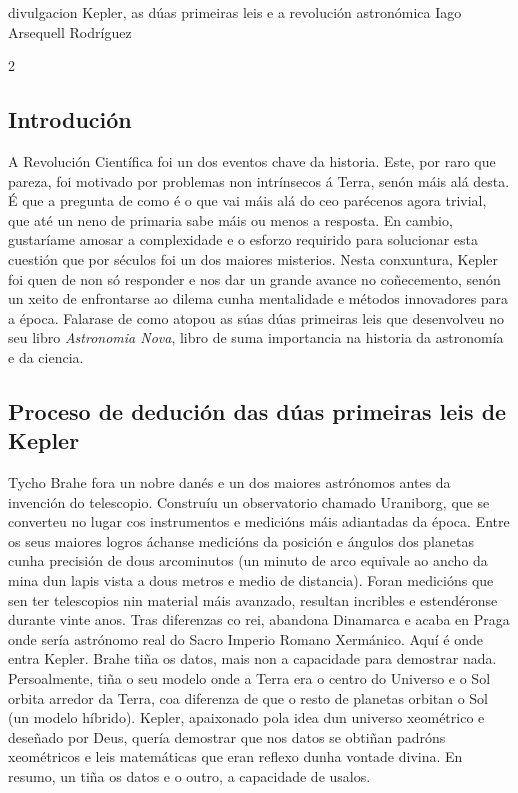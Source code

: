 \Artigo%
{divulgacion}%
{Kepler, as dúas primeiras leis e a revolución astronómica}%
{Iago Arsequell Rodríguez}%
{}%

\begin{multicols}{2}

\subsection*{Introdución}

A Revolución Científica foi un dos eventos chave da historia. Este, por raro
que pareza, foi motivado por problemas non intrínsecos á Terra, senón máis alá
desta. É que a pregunta de como é o que vai máis alá do ceo parécenos agora
trivial, que até un neno de primaria sabe máis ou menos a resposta. En cambio,
gustaríame amosar a complexidade e o esforzo requirido para solucionar esta
cuestión que por séculos foi un dos maiores misterios. Nesta conxuntura, Kepler
foi quen de non só responder e nos dar un grande avance no coñecemento, senón un
xeito de enfrontarse ao dilema cunha mentalidade e métodos innovadores para a
época. Falarase de como atopou as súas dúas primeiras leis que desenvolveu no
seu libro \textit{Astronomia Nova}, libro de suma importancia na historia da
astronomía e da ciencia.

\subsection*{Proceso de dedución das dúas primeiras leis de Kepler}

Tycho Brahe fora un nobre danés e un dos maiores astrónomos antes da invención
do telescopio. Construíu un observatorio chamado Uraniborg, que se converteu no
lugar cos instrumentos e medicións máis adiantadas da época. Entre os seus
maiores logros áchanse medicións da posición e ángulos dos planetas
cunha precisión de dous arcominutos (un minuto de arco equivale ao ancho da
mina dun lapis vista a dous metros e medio de distancia). Foran medicións que
sen ter telescopios nin material máis avanzado, resultan incribles e estendéronse
durante vinte anos. Tras diferenzas co rei, abandona Dinamarca e acaba en Praga onde
sería astrónomo real do Sacro Imperio Romano Xermánico. Aquí é onde entra
Kepler. Brahe tiña os datos, mais non a capacidade para demostrar nada.
Persoalmente, tiña o seu modelo onde a Terra era o centro do Universo e o Sol
orbita arredor da Terra, coa diferenza de que o resto de planetas orbitan o Sol
(un modelo híbrido). Kepler, apaixonado pola idea dun universo xeométrico e
deseñado por Deus, quería demostrar que nos datos se obtiñan padróns
xeométricos e leis matemáticas que eran reflexo dunha vontade divina. En
resumo, un tiña os datos e o outro, a capacidade de usalos.


\end{multicols}
